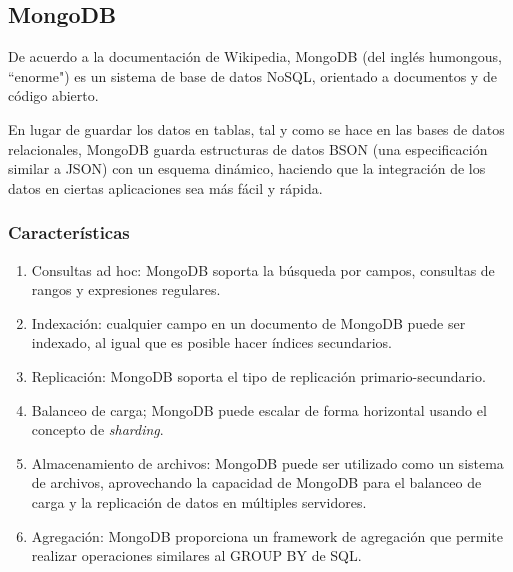 \subsection*{MongoDB}
De acuerdo a la documentación de Wikipedia\cite{noauthor_mongodb_nodate}, MongoDB (del inglés humongous, ``enorme") es un sistema de base de datos NoSQL, orientado a documentos y de código abierto.


En lugar de guardar los datos en tablas, tal y como se hace en las bases de datos relacionales, MongoDB guarda estructuras de datos BSON (una especificación similar a JSON) con un esquema dinámico, haciendo que la integración de los datos en ciertas aplicaciones sea más fácil y rápida.

\subsubsection*{Características}
\begin{enumerate}
    \item Consultas ad hoc: MongoDB soporta la búsqueda por campos, consultas de rangos y expresiones regulares.
    \item Indexación: cualquier campo en un documento de MongoDB puede ser indexado, al igual que es posible hacer índices secundarios. 
    \item Replicación: MongoDB soporta el tipo de replicación primario-secundario. 
    \item Balanceo de carga; MongoDB puede escalar de forma horizontal usando el concepto de \textit{sharding}.
    \item Almacenamiento de archivos: MongoDB puede ser utilizado como un sistema de archivos, aprovechando la capacidad de MongoDB para el balanceo de carga y la replicación de datos en múltiples servidores. 
    \item Agregación: MongoDB proporciona un framework de agregación que permite realizar operaciones similares al GROUP BY de SQL.
\end{enumerate}
